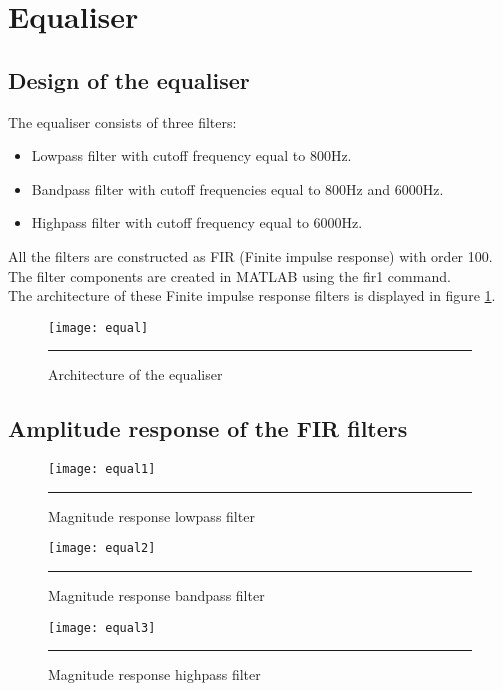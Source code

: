 \section{Equaliser}
\subsection{Design of the equaliser}
The equaliser consists of three filters:
\begin{itemize}
\item Lowpass filter with cutoff frequency equal to 800Hz.
\item Bandpass filter with cutoff frequencies equal to 800Hz and 6000Hz.
\item Highpass filter with cutoff frequency equal to 6000Hz.
\end{itemize}
All the filters are constructed as FIR (Finite impulse response) with order 100. 
The filter components are created in MATLAB using the fir1 command.\\
The architecture of these Finite impulse response filters is displayed in figure \ref{fig:equal}.
\begin{figure}[htbp]
\centering
\texttt{[image: equal]}
\rule{30em}{0.5pt}
\caption{Architecture of the equaliser}
\label{fig:equal}
\end{figure}
\subsection{Amplitude response of the FIR filters}
\begin{figure}[htbp]
\centering
\texttt{[image: equal1]}
\rule{30em}{0.5pt}
\caption{Magnitude response lowpass filter}
\label{fig:equal1}
\end{figure}
\begin{figure}[htbp]
\centering
\texttt{[image: equal2]}
\rule{30em}{0.5pt}
\caption{Magnitude response bandpass filter}
\label{fig:equal2}
\end{figure}
\begin{figure}[htbp]
\centering
\texttt{[image: equal3]}
\rule{30em}{0.5pt}
\caption{Magnitude response highpass filter}
\label{fig:equal3}
\end{figure}
